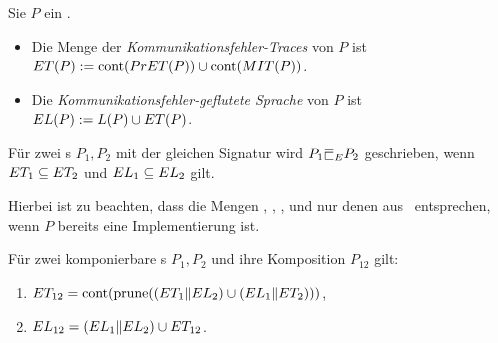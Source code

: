 \begin{Def}
  Sie $P$ ein \MEIO{}.
  \begin{itemize}
    \item Die Menge der \emph{Kommunikationsfehler-Traces} von $P$ ist $ET (P)
      := \mathrm{cont} (PrET (P)) \cup\mathrm{cont} (MIT (P))$.
    \item Die \emph{Kommunikationsfehler-geflutete Sprache} von $P$ ist $EL
      (P) := L(P) \cup ET (P)$.
  \end{itemize}
  Für zwei \MEIO{}s $P_1,P_2$ mit der gleichen Signatur wird $P_1\ERel P_2$
  geschrieben, wenn $ET _1\subseteq ET _2$ und $EL _1 \subseteq EL _2$
  gilt.
\end{Def}

Hierbei ist zu beachten, dass die Mengen \StET{}, \PrET{}, \MIT{}, \ET{} und
\EL{} nur denen aus~\cite{Schinko2016BA} entsprechen, wenn $P$ bereits eine
Implementierung ist.

\begin{Satz}
  Für zwei komponierbare \MEIO{}s $P_1,P_2$ und ihre Komposition $P_{12}$ gilt:
  \begin{enumerate}
    \item $ET _{12} = \mathrm{cont} (\mathrm{prune} ((ET _1\|EL _2) \cup (EL _1\|ET
      _2)))$,
    \item $EL _{12} = (EL _1\|EL _2) \cup ET _{12}$.
  \end{enumerate}
\end{Satz}
